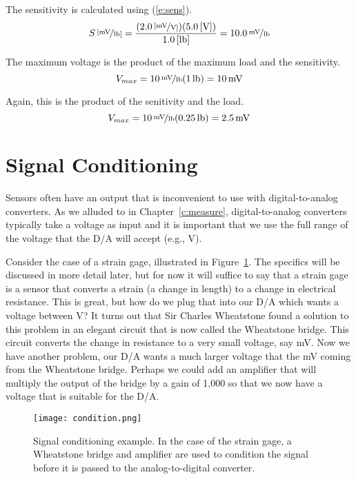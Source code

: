 \ifsolutions
\begin{soln}
The sensitivity is calculated using (\ref{e:sens}).
\[
\unitfrac[S]{[mV}{lb]} = \frac{(\unitfrac[2.0]{[mV}{V]})(\unit[5.0]{[V]})}{\unit[1.0]{[lb]}} = \unitfrac[10.0]{mV}{lb}
\]

The maximum voltage is the product of the maximum load and the sensitivity.
\[
V_{max} = \unitfrac[10]{mV}{lb} (\unit[1]{lb}) = \unit[10]{mV}
\]

Again, this is the product of the senitivity and the load.
\[
V_{max} = \unitfrac[10]{mV}{lb} (\unit[0.25]{lb}) = \unit[2.5]{mV}
\]
\end{soln}
\fi


\section{Signal Conditioning}
Sensors often have an output that is inconvenient to use with digital-to-analog converters.  As we alluded to in Chapter~\ref{c:measure}, digital-to-analog converters typically take a voltage as input and it is important that we use the full range of the voltage that the D/A will accept (e.g., \unit[0--10]{V}).  

Consider the case of a strain gage, illustrated in Figure~\ref{f:condition}.  The specifics will be discussed in more detail later, but for now it will suffice to say that a strain gage is a sensor that converts a strain (a change in length) to a change in electrical resistance.  This is great, but how do we plug that into our D/A which wants a voltage between \unit[0--10]{V}?  It turns out that Sir Charles Wheatstone found a solution to this problem in an elegant circuit that is now called the Wheatstone bridge.  This circuit converts the change in resistance to a very small voltage, say \unit[0--10]{mV}.  Now we have another problem, our D/A wants a much larger voltage that the \unit[10]{mV} coming from the Wheatstone bridge.  Perhaps we could add an amplifier that will multiply the output of the bridge by a gain of 1,000 so that we now have a  voltage that is suitable for the D/A.  

\begin{figure}[hbt!]
\centering
\texttt{[image: condition.png]}
\caption{Signal conditioning example.  In the case of the strain gage, a Wheatstone bridge and amplifier are used to condition the signal before it is passed to the analog-to-digital converter.}
\label{f:condition}
\end{figure}

